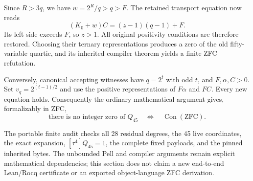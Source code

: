 Since \(R>3q\), we have \(w=2^R/q>q>F\).  The retained transport
equation now reads
\[
 (K_0+w)C=(z-1)(q-1)+F.
\]
Its left side exceeds \(F\), so \(z>1\).  All original positivity
conditions are therefore restored.  Choosing their ternary representations
produces a zero of the old fifty-variable quartic, and its inherited
compiler theorem yields a finite ZFC refutation.

Conversely, canonical accepting witnesses have \(q=2^t\) with odd
\(t\), and \(F,\alpha,C>0\).  Set \(v_q=2^{(t-1)/2}\) and use
the positive representations of \(F\alpha\) and \(FC\).  Every new
equation holds.  Consequently the ordinary mathematical argument gives,
formalizably in ZFC,
\[
 \text{there is no integer zero of }Q_{45}
 \quad\Longleftrightarrow\quad \operatorname{Con}(\mathrm{ZFC}).
\]

The portable finite audit checks all 28 residual degrees, the 45 live
coordinates, the exact expansion, \([\tau^4]Q_{45}=1\), the complete
fixed payloads, and the pinned inherited bytes.  The unbounded Pell and
compiler arguments remain explicit mathematical dependencies; this
section does not claim a new end-to-end Lean/Rocq certificate or an
exported object-language ZFC derivation.
